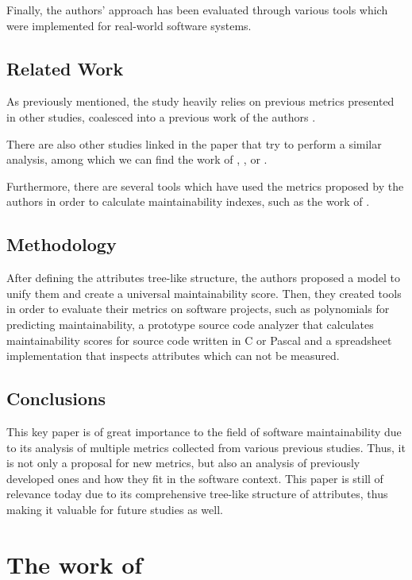 \documentclass[a4paper,portrait,12pt]{article}
\begin{document}
Finally, the authors' approach has been evaluated through various tools which were
implemented for real-world software systems.

\subsection{Related Work}

As previously mentioned, the study heavily relies on previous metrics presented 
in other studies, coalesced into a previous work of the authors 
\citep{oman1992definition}. 

There are also other studies linked in the paper that try to perform a similar analysis,
among which we can find the work of \citet{basili1983empirical}, 
\citet{peercy1981software}, \citet{selby1989software} or \citet{kafura1987use}.

Furthermore, there are several tools which have used the metrics proposed by the
authors in order to calculate maintainability indexes, such as the work of
\citet{omen1992construction}.

\subsection{Methodology}

After defining the attributes tree-like structure, the authors proposed
a model to unify them and create a universal maintainability score. Then,
they created tools in order to evaluate their metrics on software projects,
such as polynomials for predicting maintainability, a prototype source code
analyzer that calculates maintainability scores for source code written in
C or Pascal and a spreadsheet implementation that inspects attributes which
can not be measured.

\subsection{Conclusions}

This key paper is of great importance to the field of software maintainability
due to its analysis of multiple metrics collected from various previous studies.
Thus, it is not only a proposal for new metrics, but also an analysis of 
previously developed ones and how they fit in the software context. This paper
is still of relevance today due to its comprehensive tree-like structure of 
attributes, thus making it valuable for future studies as well.

\section{The work of \cite{pfleeger1990framework}}
\end{document}
